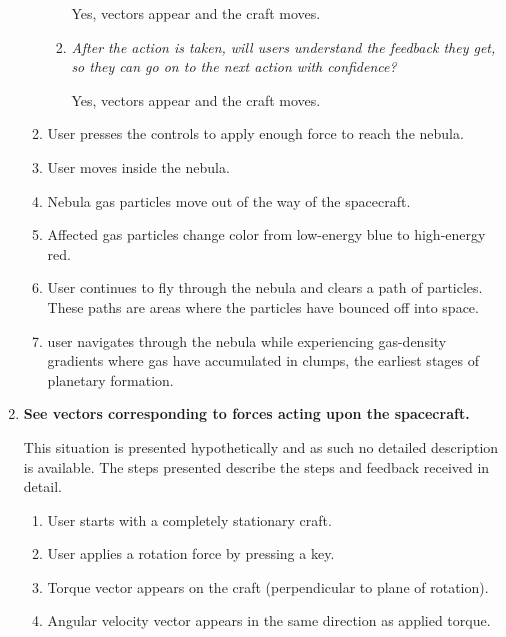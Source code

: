 \begin{enumerate}
\begin{enumerate}
\begin{enumerate}
    Yes, vectors appear and the craft moves.
    \item \emph{After the action is taken, will users understand the feedback they get, so they can go on to the next action with confidence?}

    Yes, vectors appear and the craft moves.
  \end{enumerate}

  \item User presses the controls to apply enough force to reach the nebula.

  \item User moves inside the nebula.

  \item Nebula gas particles move out of the way of the spacecraft.

  \item Affected gas particles change color from low-energy blue to high-energy red.

  \item User continues to fly through the nebula and clears a path of particles.  These paths are areas where the particles have bounced off into space.

  \item user navigates through the nebula while experiencing gas-density gradients where gas have accumulated in clumps, the earliest stages of planetary formation.

\end{enumerate}

\item\textbf{See vectors corresponding to forces acting upon the spacecraft.}

This situation is presented hypothetically and as such no detailed description is available.  The steps presented describe the steps and feedback received in detail.

\begin{enumerate}

  \item User starts with a completely stationary craft.

  \item User applies a rotation force by pressing a key.

  \item Torque vector appears on the craft (perpendicular to plane of rotation).
  
  \item Angular velocity vector appears in the same direction as applied torque.


\end{enumerate}
\end{enumerate}

